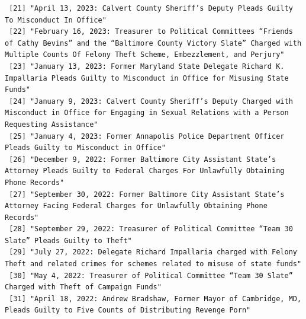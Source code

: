 \documentclass[
  letterpaper,
  DIV=11,
  numbers=noendperiod]{scrreprt}
\begin{document}
\begin{verbatim}
 [21] "April 13, 2023: Calvert County Sheriff’s Deputy Pleads Guilty To Misconduct In Office"                                                                                                                                                               
 [22] "February 16, 2023: Treasurer to Political Committees “Friends of Cathy Bevins” and the “Baltimore County Victory Slate” Charged with Multiple Counts Of Felony Theft Scheme, Embezzlement, and Perjury"                                              
 [23] "January 13, 2023: Former Maryland State Delegate Richard K. Impallaria Pleads Guilty to Misconduct in Office for Misusing State Funds"                                                                                                               
 [24] "January 9, 2023: Calvert County Sheriff’s Deputy Charged with Misconduct in Office for Engaging in Sexual Relations with a Person Requesting Assistance"                                                                                             
 [25] "January 4, 2023: Former Annapolis Police Department Officer Pleads Guilty to Misconduct in Office"                                                                                                                                                   
 [26] "December 9, 2022: Former Baltimore City Assistant State’s Attorney Pleads Guilty to Federal Charges For Unlawfully Obtaining Phone Records"                                                                                                          
 [27] "September 30, 2022: Former Baltimore City Assistant State’s Attorney Facing Federal Charges for Unlawfully Obtaining Phone Records"                                                                                                                  
 [28] "September 29, 2022: Treasurer of Political Committee “Team 30 Slate” Pleads Guilty to Theft"                                                                                                                                                         
 [29] "July 27, 2022: Delegate Richard Impallaria charged with Felony Theft and related crimes for schemes related to misuse of state funds"                                                                                                                
 [30] "May 4, 2022: Treasurer of Political Committee “Team 30 Slate” Charged with Theft of Campaign Funds"                                                                                                                                                  
 [31] "April 18, 2022: Andrew Bradshaw, Former Mayor of Cambridge, MD, Pleads Guilty to Five Counts of Distributing Revenge Porn"                                                                                                                           

\end{verbatim}
\end{document}
